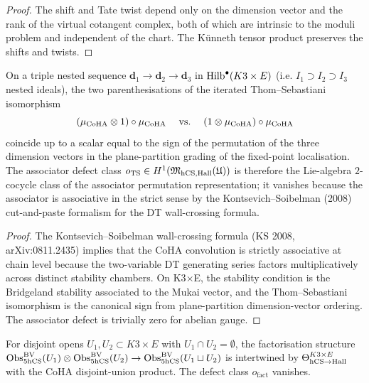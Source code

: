 \begin{proof}
The shift and Tate twist depend only on the dimension vector and the
rank of the virtual cotangent complex, both of which are intrinsic
to the moduli problem and independent of the chart. The Künneth
tensor product preserves the shifts and twists.
\end{proof}

\begin{proposition}
\label{prop:r6-thom-sebastiani-k3e}
On a triple nested sequence $\mathbf d_1 \to \mathbf d_2 \to \mathbf d_3$
in $\mathrm{Hilb}^\bullet(K3\times E)$ (i.e. $I_1\supset I_2\supset I_3$ nested
ideals), the two parenthesisations of the iterated Thom--Sebastiani
isomorphism
\[
(\mu_{\mathrm{CoHA}}\otimes 1)\circ\mu_{\mathrm{CoHA}}
\;\quad\text{vs.}\quad\;
(1\otimes\mu_{\mathrm{CoHA}})\circ\mu_{\mathrm{CoHA}}
\]
coincide up to a scalar equal to the sign of the permutation of the
three dimension vectors in the plane-partition grading of the
fixed-point localisation. The associator defect class
$o_{\mathrm{TS}}\in H^1(\mathfrak M_{\mathrm{hCS},\mathrm{Hall}}(\mathfrak U))$ is
therefore the Lie-algebra $2$-cocycle class of the associator
permutation representation; it vanishes because the associator is
associative in the strict sense by the Kontsevich--Soibelman
(2008) cut-and-paste formalism for the DT wall-crossing formula.
\end{proposition}

\begin{proof}
The Kontsevich--Soibelman wall-crossing formula (KS 2008,
arXiv:0811.2435) implies that the CoHA convolution is strictly
associative at chain level because the two-variable DT generating
series factors multiplicatively across distinct stability chambers.
On K3$\times$E, the stability condition is the Bridgeland stability
associated to the Mukai vector, and the Thom--Sebastiani isomorphism
is the canonical sign from plane-partition dimension-vector ordering.
The associator defect is trivially zero for abelian gauge.
\end{proof}

\begin{proposition}
\label{prop:r6-fact-mult-k3e}
For disjoint opens $U_1,U_2\subset K3\times E$ with $U_1\cap U_2 = \emptyset$,
the factorisation structure
$\mathrm{Obs}^{\mathrm{BV}}_{5\mathrm{hCS}}(U_1)\otimes\mathrm{Obs}^{\mathrm{BV}}_{5\mathrm{hCS}}(U_2)\to
\mathrm{Obs}^{\mathrm{BV}}_{5\mathrm{hCS}}(U_1\sqcup U_2)$ is intertwined by
$\Theta_{\mathrm{hCS}\to\mathrm{Hall}}^{K3\times E}$ with the CoHA disjoint-union
product. The defect class $o_{\mathrm{fact}}$ vanishes.
\end{proposition}

